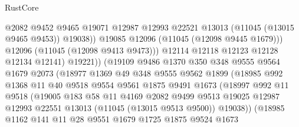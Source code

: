 \begin{lexlean}{RustCore}
\begin{coremodule}
                                @2082
                                @9452
                                @9465
                                @19071
                                @12987
                                @12993
                                @22521
                                @13013
                                (@11045 (@13015 @9465 @9453))
                                @19038))
                            @19085
                            @12096
                            (@11045 (@12098 @9445 @1679)))
                          @12096
                          (@11045 (@12098 @9413 @9473)))
                        @12114
                        @12118
                        @12123
                        @12128
                        @12134
                        @12141)
                      @19221))
                  (@19109
                    @9486
                    @1370
                    @350
                    @348
                    @9555
                    @9564
                    @1679
                    @2073
                    (@18977
                      @1369
                      @49
                      @348
                      @9555
                      @9562
                      @1899
                      (@18985
                        @992
                        @1368
                        @11
                        @40
                        @9518
                        @9554
                        @9561
                        @1875
                        @9491
                        @1673
                        (@18997
                          @992
                          @11
                          @9518
                          (@19005
                            @183
                            @58
                            @11
                            @4169
                            @2082
                            @9499
                            @9513
                            @19025
                            @12987
                            @12993
                            @22551
                            @13013
                            (@11045 (@13015 @9513 @9500))
                            @19038))
                        (@18985
                          @1162
                          @141
                          @11
                          @28
                          @9551
                          @1679
                          @1725
                          @1875
                          @9524
                          @1673

\end{coremodule}
\end{lexlean}
